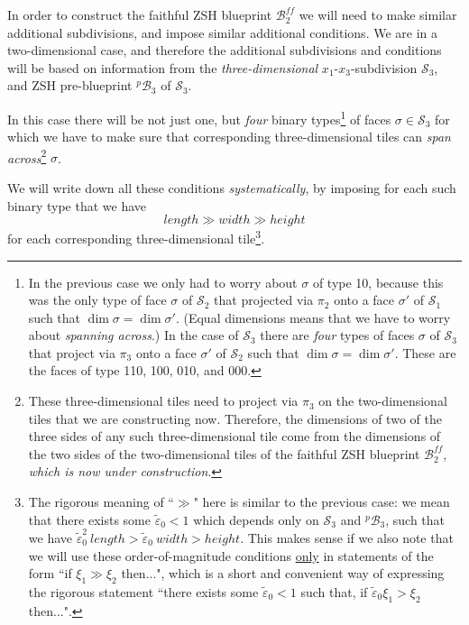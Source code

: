 \documentclass[12pt,letterpaper]{article}
\renewcommand{\S}{\mathcal{S}}
\newcommand{\B}{\mathcal{B}}
\newcommand{\eps}{\varepsilon}
\newcommand{\et}{\tilde\eps}
\newcommand{\nbhd}{\mathit{nbhd}}
\begin{document}
\medskip

In order to construct the faithful ZSH blueprint $\B_2^\mathit{ff}$ we will need to make similar additional subdivisions, and impose similar additional conditions. We are in a two-dimensional case, and therefore the additional subdivisions and conditions will be based on information from the  {\em three-dimensional} $x_1$-$x_3$-subdivision $\S_3$, and  ZSH pre-blueprint $^p\!\B_3$ of $\S_3$.

In this case there will be not just one, but {\em four} binary types\footnote{In the previous case we only had to worry about $\sigma$ of type 10, because this was the only type of face $\sigma$ of  $\S_2$ that projected via $\pi_2$ onto a face $\sigma'$ of $\S_1$ such that $\dim \sigma = \dim \sigma'$. (Equal dimensions means that we have to worry about {\em spanning across}.) In the case of $\S_3$ there are {\em four} types of faces $\sigma$ of  $\S_3$ that project via $\pi_3$ onto a face $\sigma'$ of $\S_2$ such that $\dim \sigma = \dim \sigma'$. These are the faces of type 110, 100, 010, and 000.} of faces $\sigma \in \S_3$ 
for which we have to make sure that corresponding three-dimensional tiles can {\em span across}\footnote{These three-dimensional tiles need to project via $\pi_3$ on the two-dimensional tiles that we are constructing now. Therefore, the dimensions of two of the three sides of any such three-dimensional tile come from the dimensions of the two sides of the  two-dimensional tiles of the faithful ZSH blueprint $\B_2^\mathit{ff}$, {\em which is now under construction}.} $\sigma$.

We will write down all these conditions {\em systematically}, 
by imposing for each such binary type that we have 
$$
length \gg width \gg height
$$
for each corresponding three-dimensional tile\footnote{The rigorous meaning of ``$\gg$" here is similar to the previous case: we mean that there exists some $\et_0 < 1$ which depends only on $\S_3$ and $^p\!\B_3$, such that we have 
$
\et_0^2 \ length > \et_0 \ width > height.
$
    This makes sense if we also note that we will use these order-of-magnitude conditions \ul{only} in statements of the form ``if $\xi_1 \gg \xi_2$ then...", which is a short and convenient way of expressing the rigorous statement ``there exists some $\et_0 < 1$ such that, if $\et_0 \xi_1 > \xi_2$ then...". 
}.
    
\end{document}
